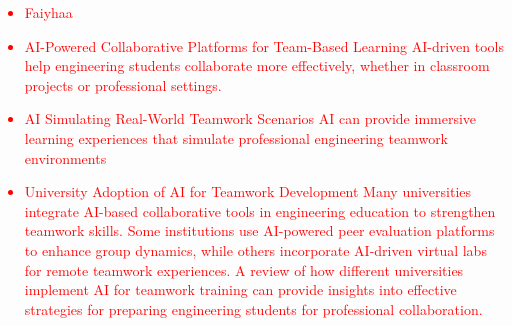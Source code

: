 \documentclass[conference]{IEEEtran}
\begin{document}
\textcolor{red}{
\begin{itemize}
    \item Faiyhaa
    \item AI-Powered Collaborative Platforms for Team-Based Learning AI-driven tools help engineering students collaborate more effectively, whether in classroom projects or professional settings.
    \item AI Simulating Real-World Teamwork Scenarios AI can provide immersive learning experiences that simulate professional engineering teamwork environments
    \item University Adoption of AI for Teamwork Development Many universities integrate AI-based collaborative tools in engineering education to strengthen teamwork skills. Some institutions use AI-powered peer evaluation platforms to enhance group dynamics, while others incorporate AI-driven virtual labs for remote teamwork experiences. A review of how different universities implement AI for teamwork training can provide insights into effective strategies for preparing engineering students for professional collaboration.
\end{itemize}
}






\end{document}
